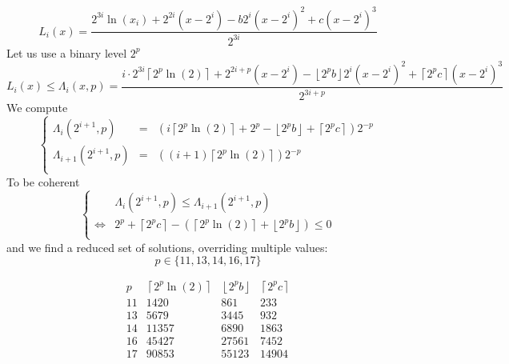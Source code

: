 \documentclass[aps]{revtex4}
\newcommand{\myfloor}[1]{{\left\lfloor#1\right\rfloor}}
\newcommand{\myceil}[1]{{\left\lceil#1\right\rceil}}
\begin{document}
\begin{equation}
	L_i(x) = \dfrac{
	2^{3i}\ln(x_i) 
	+ 2^{2i}\left(x-2^i\right)
	- b 2^{i}\left(x-2^i\right)^2
	+ c      \left(x-2^i\right)^3
	}
	{2^{3i}} 
\end{equation}
Let us use a binary level $2^p$
\begin{equation}
	L_i(x) \leq \Lambda_i(x,p) = 
	\dfrac{ i \cdot 2^{3i} \myceil{2^p \ln(2)} 
	+ 2^{2i+p} \left(x-2^i\right)
	- \myfloor{2^p b} 2^{i}\left(x-2^i\right)^2 + \myceil{2^p c} \left(x-2^i\right)^3
	}
	{2^{3i+p}}
\end{equation}
We compute
\begin{equation}
\left\lbrace
\begin{array}{rcl}
	\Lambda_i(2^{i+1},p) & = & \left( i\myceil{2^p \ln(2)} + 2^p - \myfloor{2^p b} + \myceil{2^p c} \right) 2^{-p}\\
	\Lambda_{i+1}(2^{i+1},p) & = & \left( (i+1) \myceil{2^p \ln(2)} \right) 2^{-p}\\
\end{array}
\right.
\end{equation}
To be coherent
\begin{equation}
	\left\lbrace
\begin{array}{rl}
	 & \Lambda_i(2^{i+1},p)  \leq  \Lambda_{i+1}(2^{i+1},p)\\
\Leftrightarrow & 2^p + \myceil{2^p c} - (\myceil{2^p \ln(2)} + \myfloor{2^p b}) \leq 0 \\
\end{array}
\right.
\end{equation}
and we find a reduced set of solutions, overriding multiple values:
\begin{equation}
	p \in \lbrace 11,13,14,16,17 \rbrace
\end{equation}

\begin{equation}
\begin{array}{cccc}
p & \myceil{2^p \ln(2)} &  \myfloor{2^p b} & \myceil{2^p c}\\
11 & 1420 & 861 & 233\\
13 & 5679 & 3445 & 932\\
14 & 11357 & 6890 & 1863\\
16 & 45427 & 27561 & 7452\\
17 & 90853 & 55123 & 14904\\
\end{array}
\end{equation}
\end{document}
